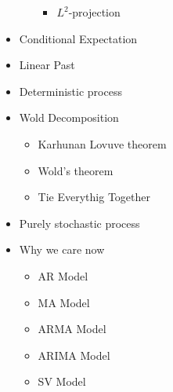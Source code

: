 \documentclass[answers,12pt,addpoints]{exam}
\begin{document}
\begin{itemize}
\begin{itemize}
\begin{itemize}
            \item $L^2$-projection
        \end{itemize}
    \end{itemize}
    \item Conditional Expectation
    \item Linear Past 
    \item Deterministic process
    \item Wold Decomposition
    \begin{itemize}
        \item Karhunan Lovuve theorem
        \item Wold's theorem
        \item Tie Everythig Together
    \end{itemize}
    \item Purely stochastic process
    \item Why we care now 
    \begin{itemize}
        \item AR Model 
        \item MA Model
        \item ARMA Model
        \item ARIMA Model
        \item SV Model
    \end{itemize}
\end{itemize}
\end{document}
